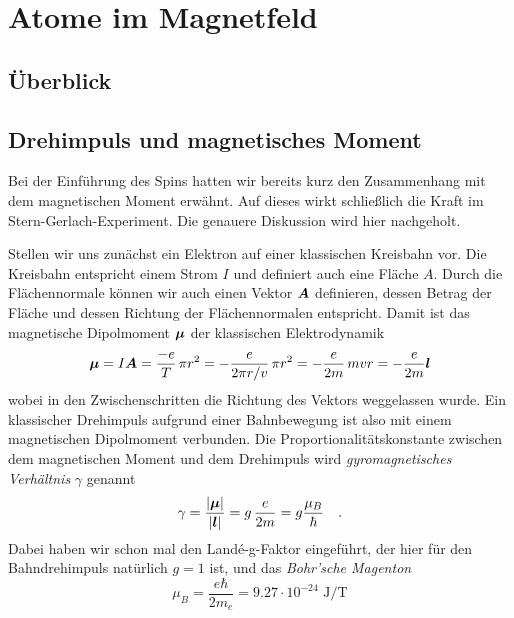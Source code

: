 \renewcommand{\lastmod}{29. November 2024}
\renewcommand{\chapterauthors}{Markus Lippitz}

\chapter{Atome im Magnetfeld}






\section{Überblick}





\section{Drehimpuls und magnetisches Moment}

Bei der Einführung des Spins hatten wir bereits kurz den Zusammenhang mit dem magnetischen Moment erwähnt. Auf dieses wirkt schließlich die Kraft im Stern-Gerlach-Experiment. Die genauere Diskussion wird hier nachgeholt.

Stellen wir uns zunächst ein Elektron auf einer klassischen Kreisbahn vor. Die Kreisbahn entspricht einem Strom $I$ und definiert auch eine Fläche $A$. Durch die Flächennormale können wir auch einen Vektor $\boldsymbol{A}$ definieren, dessen Betrag der Fläche und dessen Richtung der Flächennormalen entspricht. Damit ist das magnetische Dipolmoment $\boldsymbol{\mu}$ der klassischen Elektrodynamik 
\begin{equation}
    \boldsymbol{\mu} = I \boldsymbol{A} = \frac{-e}{T} \, \pi r^2 = - \frac{e}{2\pi r/v} \, \pi r^2 
= -\frac{e}{2m} \, m v r = - \frac{e}{2m} \boldsymbol{l}
\end{equation}
wobei in den Zwischenschritten die Richtung des Vektors weggelassen wurde. Ein klassischer Drehimpuls aufgrund einer Bahnbewegung ist also mit einem magnetischen Dipolmoment verbunden. Die Proportionalitätskonstante zwischen dem magnetischen Moment und dem Drehimpuls wird \emph{gyromagnetisches Verhältnis} $\gamma$ genannt
\begin{equation}
    \gamma  = \frac{|\boldsymbol{\mu}|}{|\boldsymbol{l}|} = g \, \frac{e}{2m} = g \frac{\mu_B}{\hbar} \quad .
\end{equation}
Dabei haben wir schon mal den Landé-g-Faktor eingeführt, der hier für den Bahndrehimpuls natürlich $g=1$ ist, und das \emph{Bohr'sche Magenton} 
\begin{equation}
\mu_B = \frac{e \hbar}{2 m_e} = 9.27 \cdot 10^{-24} \text{ J/T}    
\end{equation}



